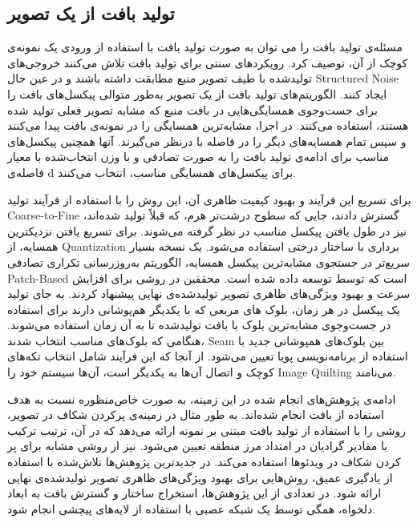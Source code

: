 \subsection{تولید بافت از یک تصویر} \label{texSynLit}
مسئله‌ی تولید بافت را می توان به صورت تولید بافت با استفاده از ورودی یک نمونه‌ی کوچک از آن، توصیف کرد. رویکردهای سنتی برای تولید بافت تلاش می‌کنند خروجی‌های تولید‌شده با طیف تصویر منبع مطابقت داشته باشند و در عین حال \gls{Structured Noise} ایجاد کنند. الگوریتم‌های تولید بافت از یک تصویر به‌طور متوالی پیکسل‌های بافت را برای جست‌وجوی همسایگی‌هایی در بافت منبع که مشابه تصویر فعلی تولید شده هستند، استفاده می‌کنند\cite{nonParam}. در اجرا، مشابه‌ترین همسایگی را در نمونه‌ی بافت پیدا می‌کنند و سپس تمام همسایه‌های دیگر را در فاصله
  با
  درنظر می‌گیرند. آنها همچنین پیکسل‌های مناسب برای ادامه‌ی تولید بافت را به صورت تصادفی و با وزن انتخاب‌شده با معیار فاصله‌ی d برای پیکسل‌های همسایگی مناسب، انتخاب می‌کنند.

برای تسریع این فرآیند و بهبود کیفیت ظاهری آن، \cite{treeVecQuant} این روش را با استفاده از فرآیند تولید \gls{Coarse-to-Fine} گسترش دادند، جایی که سطوح درشت‌تر هرم، که قبلاً تولید شده‌اند، نیز در طول یافتن پیکسل مناسب در نظر گرفته می‌شوند\cite{deBonet}. برای تسریع یافتن نزدیکترین همسایه، از \gls{Quantization} برداری با ساختار درختی استفاده می‌شود. یک نسخه بسیار سریع‌تر در جستجوی مشابه‌ترین پیکسل همسایه، الگوریتم به‌روزرسانی تکراری تصادفی \gls{Patch-Based} است که توسط \cite{patchMatch} توسعه داده شده است. محققین در
\cite{imageQuilting} 
روشی برای افزایش سرعت و بهبود ویژگی‌های ظاهری تصویر تولید‌شده‌ی نهایی پیشنهاد کردند. به جای تولید یک پیکسل در هر زمان، بلوک های مربعی که با یکدیگر هم‌پوشانی دارند برای استفاده در جست‌وجوی مشابه‌ترین بلوک با بافت تولید‌شده‌ تا به آن زمان استفاده می‌شوند. هنگامی که بلوک‌های مناسب انتخاب شدند، \gls{Seam} بین بلوک‌های همپوشانی جدید با استفاده از برنامه‌نویسی پویا تعیین می‌شود. از آنجا که این فرآیند شامل انتخاب تکه‌های کوچک و اتصال آن‌ها به یکدیگر است، آن‌ها سیستم خود را \gls{Image Quilting} می‌نامند.

ادامه‌ی پژوهش‌های انجام شده در این زمینه، به صورت خاص‌منظوره نسبت به هدف استفاده از بافت انجام شده‌اند. به طور مثال در زمینه‌ی پرکردن شکاف در تصویر، \cite{criminisiPerezInpaint} روشی را با استفاده از تولید بافت مبتنی بر نمونه ارائه می‌دهد که در آن، ترتیب ترکیب با مقادیر گرادیان در امتداد مرز منطقه تعیین می‌شود. \cite{wexlerIrani} نیز از روشی مشابه برای پر کردن شکاف در ویدئو‌ها استفاده می‌کند. در جدیدترین پژوهش‌ها تلاش‌شده با استفاده از یادگیری عمیق، روش‌هایی برای بهبود ویژگی‌های ظاهری تصویر تولید‌شده‌ی نهایی ارائه شود\cite{nazeri2019edgeconnect}\cite{yi2020contextual}. در تعدادی از این پژوهش‌ها، استخراج ساختار و گسترش بافت به ابعاد دلخواه، همگی توسط یک شبکه‌ عصبی با استفاده از لایه‌های پیچشی انجام شود\cite{gatys2015texture}\cite{risser2020optimal}.
